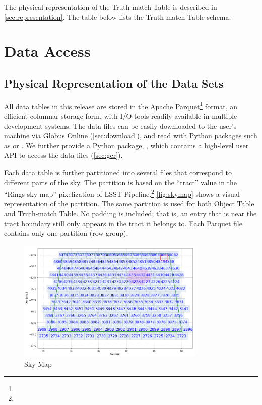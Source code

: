 \documentclass[11pt]{report}
\begin{document}
The physical representation of the Truth-match Table is described in \autoref{sec:representation}. The table below lists the Truth-match Table schema.





\section{Data Access}
\label{sec:access}


\subsection{Physical Representation of the Data Sets}
\label{sec:representation}

All data tables in this release are stored in the Apache Parquet\footnote{} format, an efficient columnar storage form, with I/O tools readily available in multiple development systems. 
The data files can be easily downloaded to the user's machine via Globus Online (\autoref{sec:download}), and read with Python packages such as  or .
We further provide a Python package, , which contains a high-level user API to access the data files (\autoref{sec:gcr}). 

Each data table is further partitioned into several files that correspond to different parts of the sky. The partition is based on the ``tract'' value in the ``Rings sky map'' pixelization of LSST Pipeline.\footnote{} \autoref{fig:skymap} shows a visual representation of the partition. The same partition is used for both Object Table and Truth-match Table. No padding is included; that is, an entry that is near the tract boundary still only appears in the tract it belongs to. Each Parquet file contains only one partition (row group). 

\begin{figure}[tbh!]
    \centering
    \includegraphics[width=0.8\textwidth]{figs/skymap.png}
    \caption{Sky Map}
    \label{fig:skymap}
\end{figure}
\end{document}
